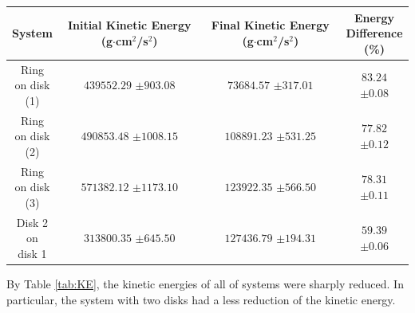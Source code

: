 \begin{center}
  \begin{tabular}{|c|c|c|c|}
    \hline
    System & \makecell{Initial \\Kinetic\\Energy\\(g$\cdot$cm$^2$/s$^2$)} & \makecell{Final\\Kinetic\\Energy\\(g$\cdot$cm$^2$/s$^2$)} & \makecell{Energy\\Difference\\(\%)}\\
    \hline
    \makecell{Ring             \\on disk\\(1)} & \makecell{$439552.29$\\$\pm903.08$} & \makecell{$73684.57$\\$\pm317.01$} & \makecell{$83.24$\\$\pm0.08$}\\
    \hline
    \makecell{Ring             \\on disk\\(2)} & \makecell{$490853.48$\\$\pm1008.15$} & \makecell{$108891.23$\\$\pm531.25$} & \makecell{$77.82$\\$\pm0.12$}\\
    \hline
    \makecell{Ring             \\on disk\\(3)} & \makecell{$571382.12$\\$\pm1173.10$} & \makecell{$123922.35$\\$\pm566.50$} & \makecell{$78.31$\\$\pm0.11$}\\
    \hline
    \makecell{Disk 2           \\on\\disk 1} & \makecell{$313800.35$\\$\pm645.50$} & \makecell{$127436.79$\\$\pm194.31$} & \makecell{$59.39$\\$\pm0.06$}\\
    \hline
  \end{tabular}
  \label{tab:KE}
\end{center}
\par
By Table \ref{tab:KE}, the kinetic energies of all of systems were sharply reduced. In particular, the system with two disks had a less reduction of the kinetic energy.

